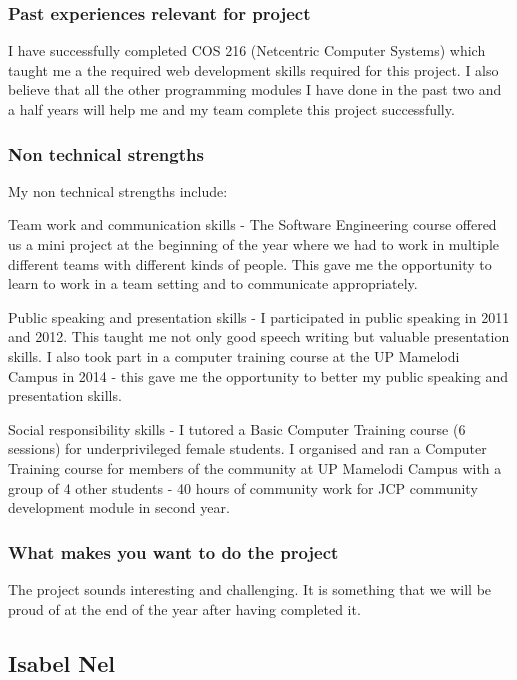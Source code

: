 \documentclass[hidelinks, 12pt, oneside]{article}
\begin{document}
\subsubsection{Past experiences relevant for project}

I have successfully completed COS 216 (Netcentric Computer Systems)  which taught me a the required web development skills required for this project. I also believe that all the other programming modules I have done in the past two and a half years will help me and my team complete this project successfully.

\subsubsection{Non technical strengths}

My non technical strengths include: 

Team work and communication skills - The Software Engineering course offered us a mini project at the beginning of the year where we had to work in multiple different teams with different kinds of people. This gave me the opportunity to learn to work in a team setting and to communicate appropriately.
 
Public speaking and presentation skills - I participated in public speaking in 2011 and 2012. This taught me not only good speech writing but valuable presentation skills.
I also took part in a computer training course at the UP Mamelodi Campus in 2014 - this gave me the opportunity to better my public speaking and presentation skills.

Social responsibility skills - I tutored a Basic Computer Training course (6 sessions) for underprivileged female students.
I organised and ran a Computer Training course for members of the community at UP Mamelodi Campus with a group of 4 other students - 40 hours of community work for JCP community development module in second year.

\subsubsection{What makes you want to do the project}

The project sounds interesting and challenging. It is something that we will be proud of at the end of the year after having completed it.

\subsection{Isabel Nel}
\end{document}
